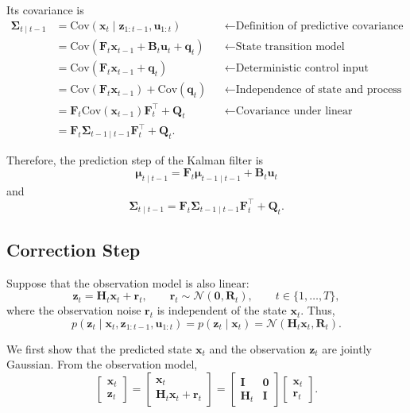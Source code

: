 \documentclass[../Bayesian_Inference.tex]{subfiles}
\begin{document}
Its covariance is
\[
\begin{aligned}
    \mathbf{\Sigma}_{t\mid t-1}
    &= \mathrm{Cov}(\bm{x}_t\mid\bm{z}_{1:t-1},\bm{u}_{1:t}) &&\leftarrow \text{Definition of predictive covariance} \\
    &= \mathrm{Cov}(\mathbf{F}_t\bm{x}_{t-1}+\mathbf{B}_t\bm{u}_t+\bm{q}_t) &&\leftarrow \text{State transition model} \\
    &= \mathrm{Cov}(\mathbf{F}_t\bm{x}_{t-1}+\bm{q}_t) &&\leftarrow \text{Deterministic control input} \\
    &= \mathrm{Cov}(\mathbf{F}_t\bm{x}_{t-1})+\mathrm{Cov}(\bm{q}_t) &&\leftarrow \text{Independence of state and process noise} \\
    &= \mathbf{F}_t\mathrm{Cov}(\bm{x}_{t-1})\mathbf{F}_t^\top+\mathbf{Q}_t &&\leftarrow \text{Covariance under linear transformation} \\
    &= \mathbf{F}_t\mathbf{\Sigma}_{t-1\mid t-1}\mathbf{F}_t^\top+\mathbf{Q}_t.
\end{aligned}
\]

Therefore, the prediction step of the Kalman filter is
\[
    \bm{\mu}_{t\mid t-1}=\mathbf{F}_t\bm{\mu}_{t-1\mid t-1}+\mathbf{B}_t\bm{u}_t
\]
and
\[
    \mathbf{\Sigma}_{t\mid t-1}=\mathbf{F}_t\mathbf{\Sigma}_{t-1\mid t-1}\mathbf{F}_t^\top+\mathbf{Q}_t.
\]

\subsection{Correction Step}

Suppose that the observation model is also linear:
\[
    \bm{z}_t = \mathbf{H}_t\bm{x}_t + \bm{r}_t,
    \qquad
    \bm{r}_t \sim \mathcal{N}(\bm{0},\mathbf{R}_t),
    \qquad
    t\in\{1,\dots,T\},
\]
where the observation noise $\bm{r}_t$ is independent of the state $\bm{x}_t$. Thus,
\[
    p(\bm{z}_t\mid\bm{x}_t,\bm{z}_{1:t-1},\bm{u}_{1:t})=p(\bm{z}_t\mid\bm{x}_t)=\mathcal{N}\left(\mathbf{H}_t\bm{x}_t,\mathbf{R}_t\right).
\]

We first show that the predicted state $\bm{x}_t$ and the observation $\bm{z}_t$ are jointly Gaussian. From the observation model,
\[
    \begin{bmatrix}
        \bm{x}_t \\
        \bm{z}_t
    \end{bmatrix}
    =
    \begin{bmatrix}
        \bm{x}_t \\
        \mathbf{H}_t\bm{x}_t+\bm{r}_t
    \end{bmatrix}
    =
    \begin{bmatrix}
        \mathbf{I} & \mathbf{0} \\
        \mathbf{H}_t & \mathbf{I}
    \end{bmatrix}
    \begin{bmatrix}
        \bm{x}_t \\
        \bm{r}_t
    \end{bmatrix}.
\]
\end{document}
